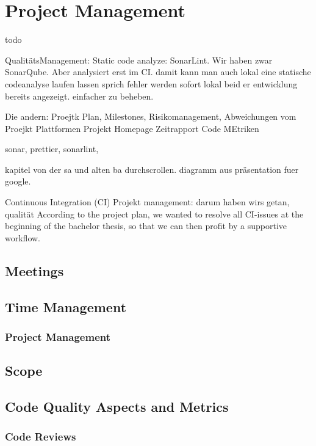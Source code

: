 \section{Project Management}
\label{section:project_management}


todo

QualitätsManagement: Static code analyze: SonarLint. \cite{sonar-lint}
Wir haben zwar SonarQube. Aber analysiert erst im CI.
damit kann man auch lokal eine statische codeanalyse laufen lassen sprich fehler werden sofort lokal beid er
entwicklung bereits angezeigt. einfacher zu beheben.


Die andern:
Proejtk Plan, Milestones, Risikomanagement, Abweichungen vom Proejkt Plattformen
Projekt Homepage
Zeitrapport
Code MEtriken



sonar, prettier, sonarlint,

kapitel von der sa und alten ba durchscrollen.
diagramm aus präsentation fuer google.

Continuous Integration (CI)
Projekt management: darum haben wirs getan, qualität
According to the project plan, we wanted to resolve all CI-issues at the beginning of the bachelor thesis, so that we can then profit by a supportive workflow.




\subsection{Meetings}

\subsection{Time Management}
\subsubsection{Project Management}

\subsection{Scope}

\subsection{Code Quality Aspects and Metrics}

\subsubsection{Code Reviews}

